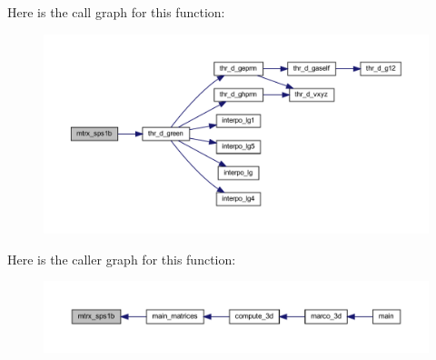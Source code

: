 Here is the call graph for this function\+:
\nopagebreak
\begin{figure}[H]
\begin{center}
\leavevmode
\includegraphics[width=350pt]{Marco_8f90_aefe021b6f1e5d06c1e5f731ef776542d_cgraph}
\end{center}
\end{figure}
Here is the caller graph for this function\+:
\nopagebreak
\begin{figure}[H]
\begin{center}
\leavevmode
\includegraphics[width=350pt]{Marco_8f90_aefe021b6f1e5d06c1e5f731ef776542d_icgraph}
\end{center}
\end{figure}
\mbox{\label{Marco_8f90_a1c4fe90d64ccbd00c0df9a4f3544a6c8}} 
